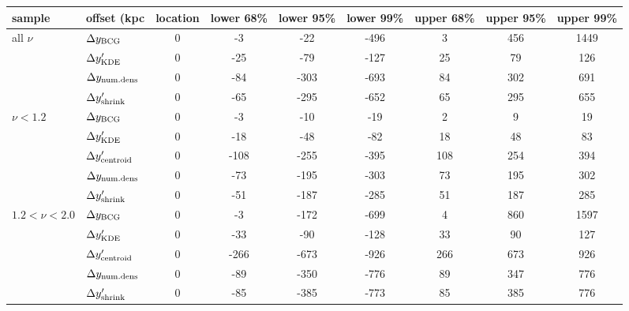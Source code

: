\begin{tabular}{llccccccc}
\toprule
sample & offset (kpc  &  location &  lower 68\% &  lower 95\% &  lower 99\% &  upper 68\% &  upper 95\% &  upper 99\% \\
\midrule
all $\nu$& $\Delta y_{\rm BCG}$                &         0 &          -3 &         -22 &        -496 &           3 &         456 &        1449 \\
& $\Delta y_{\rm KDE}'$               &         0 &         -25 &         -79 &        -127 &          25 &          79 &         126 \\
& $\Delta y_{\rm num. dens}$          &        0 &         -84 &        -303 &        -693 &          84 &         302 &         691 \\
& $\Delta y_{\rm shrink}'$            &        0 &         -65 &        -295 &        -652 &          65 &         295 &         655 \\
\midrule
$\nu < 1.2$& $\Delta y_{\rm BCG}$              &        0 &          -3 &         -10 &         -19 &           2 &           9 &          19 \\
& $\Delta y_{\rm KDE}'$             &         0 &         -18 &         -48 &         -82 &          18 &          48 &          83 \\
& $\Delta y_{\rm centroid}'$         &        0 &        -108 &        -255 &        -395 &         108 &         254 &         394 \\
& $\Delta y_{\rm num. dens}$        &        0 &         -73 &        -195 &        -303 &          73 &         195 &         302 \\
& $\Delta y_{\rm shrink}'$          &         0 &         -51 &        -187 &        -285 &          51 &         187 &         285 \\
\midrule
$1.2 < \nu < 2.0$& $\Delta y_{\rm BCG}$        &         0 &          -3 &        -172 &        -699 &           4 &         860 &        1597 \\
& $\Delta y_{\rm KDE}'$       &        0 &         -33 &         -90 &        -128 &          33 &          90 &         127 \\
& $\Delta y_{\rm centroid}'$   &         0 &        -266 &        -673 &        -926 &         266 &         673 &         926 \\
& $\Delta y_{\rm num. dens}$  &         0 &         -89 &        -350 &        -776 &          89 &         347 &         776 \\
& $\Delta y_{\rm shrink}'$    &        0 &         -85 &        -385 &        -773 &          85 &         385 &         776 \\
\bottomrule
\end{tabular}
